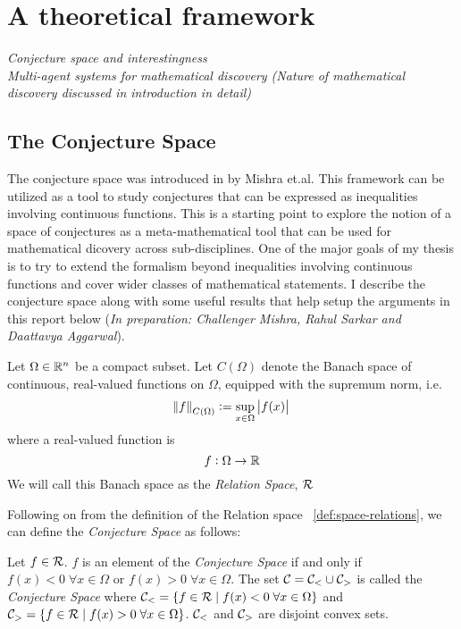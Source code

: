 \chapter{A theoretical framework}
\textit{Conjecture space and interestingness}\\
\textit{Multi-agent systems for mathematical discovery (Nature of mathematical discovery discussed in introduction in detail)}

\section{The Conjecture Space}

The conjecture space was introduced in \cite{mishraConjGen2023} by Mishra et.al. This framework can be utilized as a tool to study conjectures that can be expressed as inequalities involving continuous functions. This is a starting point to explore the notion 
of a space of conjectures as a meta-mathematical tool that can be used for mathematical dicovery across sub-disciplines. One of the major goals of my thesis is to try to extend the formalism beyond inequalities involving continuous functions and cover wider classes of mathematical statements. 
I describe the conjecture space along with some useful results that help setup the arguments in this report below (\textit{In preparation: Challenger Mishra, Rahul Sarkar and Daattavya Aggarwal}).

\begin{definition}
    \label{def:space-relations}
    Let $\Omega\in\mathbb{R}^n$ be a compact subset. Let $C(\Omega)$ denote the Banach space of continuous, real-valued functions on $\Omega$, equipped with the supremum norm, i.e.
    \begin{equation*}
        \norm{f}_{C(\Omega)} := \sup_{x\in\Omega} \left|f(x)\right|    
    \end{equation*}
    where a real-valued function is
    \begin{equation*}
        f:\Omega\rightarrow\mathbb{R}
    \end{equation*}
    We will call this Banach space as the \textit{Relation Space}, $\mathcal{R}$
\end{definition}

Following on from the definition of the Relation space ~\ref{def:space-relations}, we can define the \textit{Conjecture Space} as follows:
\begin{definition}
    Let $f\in\mathcal{R}$. $f$ is an element of the \textit{Conjecture Space} if and only if $f(x) < 0 \;\forall x\in\Omega$ or $f(x) > 0 \; \forall x\in\Omega$.
    The set $\mathcal{C} = \mathcal{C}_{<}\cup\mathcal{C}_{>}$ is called the \textit{Conjecture Space} where $\mathcal{C}_{<} = \{f\in\mathcal{R}\;|\; f(x)<0\;\forall x\in\Omega\}$ and $\mathcal{C}_{>} = \{f\in\mathcal{R}\;|\;f(x)>0\;\forall x\in\Omega\}$.
    $\mathcal{C}_{<}$ and $\mathcal{C}_{>}$ are disjoint convex sets.
\end{definition}

